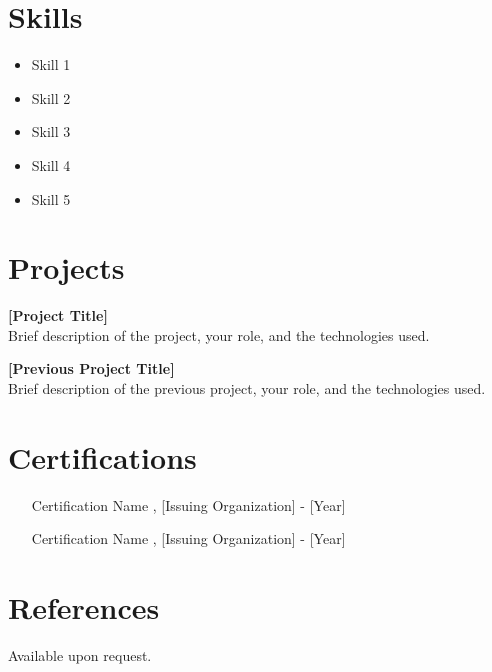 \documentclass[a4paper,10pt]{article}
\begin{document}
\section*{Skills}
\begin{itemize}[left=0pt]
    \item Skill 1
    \item Skill 2
    \item Skill 3
    \item Skill 4
    \item Skill 5
\end{itemize}

\section*{Projects}
\textbf{[Project Title]} \\
Brief description of the project, your role, and the technologies used.

\textbf{[Previous Project Title]} \\
Brief description of the previous project, your role, and the technologies used.

\section*{Certifications}
\begin{itemize}[left=0pt]
    \item [Certification Name], [Issuing Organization] - [Year]
    \item [Certification Name], [Issuing Organization] - [Year]
\end{itemize}

\section*{References}
Available upon request.
\end{document}
